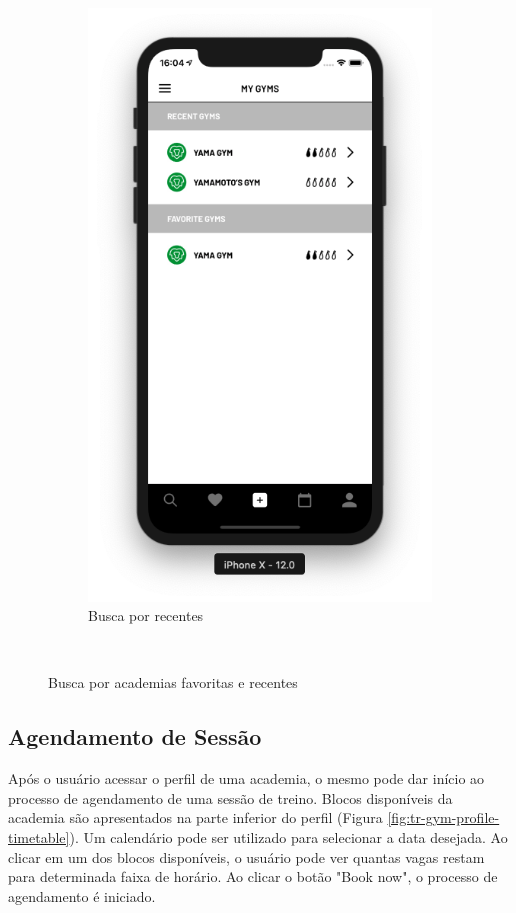 \begin{figure}[H]
\begin{subfigure}[b]{0.4\textwidth}
        \includegraphics[width=\textwidth]{pfc/figuras/tr-my-gyms.png}
        \caption{Busca por recentes}
        \label{fig:tr-recent}
    \end{subfigure}
    ~
    \caption{Busca por academias favoritas e recentes}
    \label{fig:tr-alternative-search}
\end{figure}

\subsection{Agendamento de Sessão}
Após o usuário acessar o perfil de uma academia, o mesmo pode dar início ao processo de agendamento de uma sessão de treino. Blocos disponíveis da academia são apresentados na parte inferior do perfil (Figura \ref{fig:tr-gym-profile-timetable}). Um calendário pode ser utilizado para selecionar a data desejada. Ao clicar em um dos blocos disponíveis, o usuário pode ver quantas vagas restam para determinada faixa de horário. Ao clicar o botão "Book now", o processo de agendamento é iniciado.

